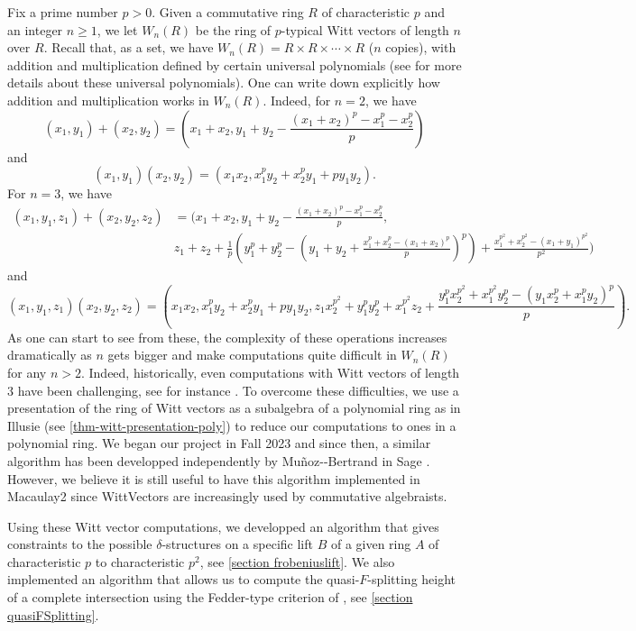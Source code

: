 \documentclass{article}
\theoremstyle{plain}
\theoremstyle{definition}
\begin{document}
Fix a prime number $p > 0$.
Given a commutative ring $R$ of characteristic $p$ and an integer $n \geq 1$, we let $W_{n}(R)$ be the ring of $p$-typical Witt vectors of length $n$ over $R$. Recall that, as a set, we have $W_n(R) = R \times R \times \cdots \times R$ ($n$ copies), with addition and multiplication defined by certain universal polynomials (see \cite[Section 8.10]{JacobsonBasicAlgebraII} for more details about these universal polynomials). One can write down explicitly how addition and multiplication works in $W_n(R)$. Indeed, for $n=2$, we have 
\[
(x_1,y_1)+(x_2,y_2)=\left(x_1+x_2, y_1+y_2-\frac{(x_1+x_2)^p-x_1^p-x_2^p}{p}\right)
\]
and 
\[
(x_1,y_1)(x_2,y_2)=\left(x_1x_2, x_1^py_2+x_2^py_1+py_1y_2\right).
\]
For $n=3$, we have 
\begin{align*}
(x_1,y_1,z_1)+(x_2,y_2,z_2)&=\Bigg(x_1+x_2, y_1+y_2-\frac{(x_1+x_2)^p-x_1^p-x_2^p}{p},\\
&z_1+z_2+\frac{1}{p}\left(y_1^p+y_2^p-\left(y_1+y_2+\frac{x_1^p+x_2^p-(x_1+x_2)^p}{p}\right)^p\right)+\frac{x_1^{p^2}+x_2^{p^2}-(x_1+y_1)^{p^2}}{p^2}\Bigg)
\end{align*}
and 
\[
(x_1,y_1,z_1)(x_2,y_2,z_2)=\left(x_1x_2, x_1^py_2+x_2^py_1+py_1y_2,z_1x_2^{p^2}+y_1^py_2^p+x_1^{p^2}z_2+\frac{y_1^px_2^{p^2}+x_1^{p^2}y_2^p-(y_1x_2^p+x_1^py_2)^p}{p}\right).
\]
As one can start to see from these, the complexity of these operations increases dramatically as $n$ gets bigger and make computations quite difficult in $W_n(R)$ for any $n>2$. 
Indeed, historically, even computations with Witt vectors of length $3$ have been challenging, see for instance \cite{FinottiComputationsWittVectorsLength3}. To overcome these difficulties, we use a presentation of the ring of Witt vectors as a subalgebra of a polynomial ring as in Illusie \cite{IllusieComplexeDeRhamWittCristalline} (see \autoref{thm-witt-presentation-poly}) to reduce our computations to ones in a polynomial ring. We began our project in Fall 2023 and since then, a similar algorithm has been developped independently by Muñoz-\relax-Bertrand in Sage \cite{MunozBertrandFasterComputationWittVectors}. However, we believe it is still useful to have this algorithm implemented in Macaulay2 since WittVectors are increasingly used by commutative algebraists.

Using these Witt vector computations, we developped an algorithm that gives constraints to the possible $\delta$-structures on a specific lift $B$ of a given ring $A$ of characteristic $p$ to characteristic $p^2$, see \autoref{section frobeniuslift}. We also implemented an algorithm that allows us to compute the quasi-$F$-splitting height of a complete intersection using the Fedder-type criterion of \cite{KawakamiTakamatsuYoshikawaFedderQuasi}, see \autoref{section quasiFSplitting}.
\end{document}
